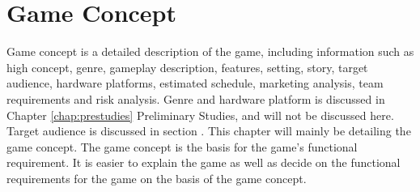 \chapter{Game Concept}
\label{chap:gameconsept}

	Game concept is a detailed description of the game, including information such as high concept,
	genre, gameplay description, features, setting, story, target audience, hardware platforms,
	estimated schedule, marketing analysis, team requirements and risk analysis. \cite{gameConcept}
	Genre and hardware platform is discussed in Chapter \ref{chap:prestudies} Preliminary Studies, and will not be
	discussed here. Target audience is discussed in section \label{subsec:planustest}. This chapter will mainly be
	detailing the game concept. The game concept is the basis for the game's functional requirement.
	It is easier to explain the game as well as decide on the functional requirements for the game
	on the basis of the game concept.
